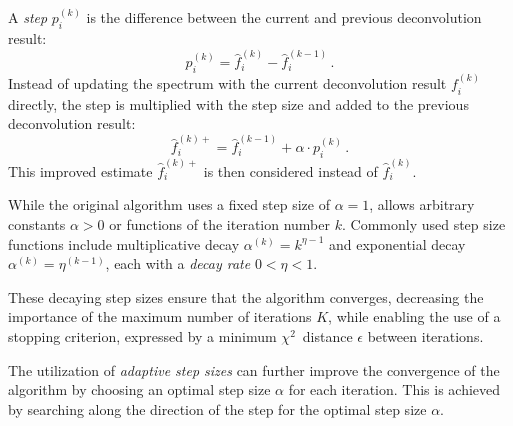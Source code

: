 A \emph{step} $p_i^{(k)}$ is the difference between the current and previous deconvolution result:
\begin{equation}
  p_i^{(k)} = \hat f_i^{(k)} - \hat f_i^{(k-1)} \, .
\end{equation}
Instead of updating the spectrum with the current deconvolution result $f_i^{(k)}$ directly,
the step is multiplied with the step size
and added to the previous deconvolution result:
\begin{equation}
  \hat f_i^{(k)+} = \hat f_i^{(k-1)} + \alpha \cdot p_i^{(k)} \, .
\end{equation}
This improved estimate $\hat f_i^{(k)+}$ is then considered instead of $\hat f_i^{(k)}$.

While the original \dsea{} algorithm uses a fixed step size of $\alpha = 1$,
\dseaplus{} allows arbitrary constants $\alpha > 0$
or functions of the iteration number $k$.
Commonly used step size functions include
multiplicative decay
  $\alpha^{(k)} = k^{\eta - 1}$
and exponential decay
  $\alpha^{(k)} = \eta^{(k - 1)}$,
each with a \emph{decay rate} $0 < \eta < 1$.

These decaying step sizes ensure that the algorithm converges,
decreasing the importance of the maximum number of iterations $K$,
while enabling the use of a stopping criterion,
  expressed by a minimum $\chi^2$~distance $\epsilon$ between iterations.


The utilization of \emph{adaptive step sizes} \cite{dsea_mirko} can further improve the convergence of the algorithm
by choosing an optimal step size $\alpha$ for each iteration.
This is achieved by searching
  along the direction of the step %
  for the optimal step size $\alpha$.

